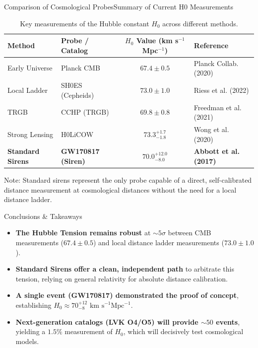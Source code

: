 \documentclass[11pt,aspectratio=169]{beamer}
\begin{document}
\begin{frame}{Comparison of Cosmological Probes}{Summary of Current H0 Measurements}
  \centering
  \begin{table}
    \caption{Key measurements of the Hubble constant $H_0$ across different methods.}
    \vspace{0.2em}
    \fontsize{8.5pt}{10.5pt}\selectfont
    \begin{tabular}{llcl}
      \toprule
      \textbf{Method} & \textbf{Probe / Catalog} & \textbf{$H_0$ Value (km s$^{-1}$Mpc$^{-1}$)} & \textbf{Reference} \\
      \midrule
      Early Universe & Planck CMB & $67.4 \pm 0.5$ & Planck Collab. (2020) \\
      Local Ladder & SH0ES (Cepheids) & $73.0 \pm 1.0$ & Riess et al. (2022) \\
      TRGB & CCHP (TRGB) & $69.8 \pm 0.8$ & Freedman et al. (2021) \\
      Strong Lensing & H0LiCOW & $73.3^{+1.7}_{-1.8}$ & Wong et al. (2020) \\
      \midrule
      \textbf{Standard Sirens} & \textbf{GW170817 (Siren)} & \textbf{$70.0^{+12.0}_{-8.0}$} & \textbf{Abbott et al. (2017)} \\
      \bottomrule
    \end{tabular}
  \end{table}
  \begin{minipage}{0.9\textwidth}
    \centering
    \fontsize{8pt}{10pt}\selectfont\color{cosmicslate} Note: Standard sirens represent the only probe capable of a direct, self-calibrated distance measurement at cosmological distances without the need for a local distance ladder.
  \end{minipage}
\end{frame}

\begin{frame}{Conclusions \& Takeaways}
  \begin{itemize}
    \item \textbf{The Hubble Tension remains robust} at $\sim 5\sigma$ between CMB measurements ($67.4 \pm 0.5$) and local distance ladder measurements ($73.0 \pm 1.0$).
    \vspace{0.8em}
    \item \textbf{Standard Sirens offer a clean, independent path} to arbitrate this tension, relying on general relativity for absolute distance calibration.
    \vspace{0.8em}
    \item \textbf{A single event (GW170817) demonstrated the proof of concept}, establishing $H_0 \approx 70^{+12}_{-8} \text{ km s}^{-1}\text{Mpc}^{-1}$.
    \vspace{0.8em}
    \item \textbf{Next-generation catalogs (LVK O4/O5) will provide $\sim 50$ events}, yielding a $1.5\%$ measurement of $H_0$, which will decisively test cosmological models.
  \end{itemize}
\end{frame}
\end{document}
